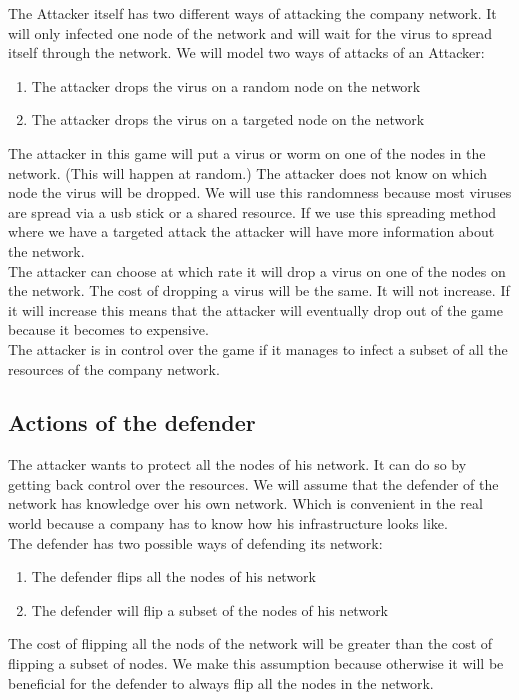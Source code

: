 The Attacker itself has two different ways of attacking the company network. It will only infected one node of the network and will wait for the virus to spread itself through the network. We will model two ways of attacks of an Attacker:
\begin{enumerate}
\item The attacker drops the virus on a random node on the network
\item The attacker drops the virus on a targeted node on the network
\end{enumerate}
The attacker in this game will put a virus or worm on one of the nodes in the network. (This will happen at random.) The attacker does not know on which node the virus will be dropped. We will use this randomness because  most viruses are spread via a usb stick or a shared resource. If we use this spreading method where we have a targeted attack the attacker will have more information about the network. \\

The attacker can choose at which rate it will drop a virus on one of the nodes on the network. The cost of dropping a virus will be the same. It will not increase. If it will increase this means that the attacker will eventually drop out of the game because it becomes to expensive.\\
The attacker is in control over the game if it manages to infect a subset of all the resources of the company network.


\subsection{Actions of the defender}
The attacker wants to protect all the nodes of his network. It can do so by getting back control over the resources. We will assume that the defender of the network has knowledge over his own network. Which is convenient in the real world because a company has to know how his infrastructure looks like.\\

The defender has two possible ways of defending its network:
\begin{enumerate}
\item The defender flips all the nodes of his network
\item The defender will flip a subset of the nodes of his network
\end{enumerate}

The cost of flipping all the nods of the network will be greater than the cost of flipping a subset of nodes. We make this assumption because otherwise it will be beneficial for the defender to always flip all the nodes in the network.\\

